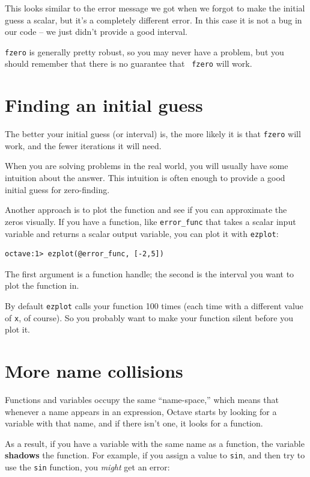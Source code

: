 \documentclass{book}
\begin{document}
This looks similar to the error message we got when we forgot to make the
initial guess a scalar, but it's a completely different error. In this case it
is not a bug in our code -- we just didn't provide a good interval.

{\tt fzero} is generally pretty robust, so you may never have a
problem, but you should remember that there is no guarantee that {\tt
fzero} will work.


\section{Finding an initial guess}

The better your initial guess (or interval) is, the more likely
it is that {\tt fzero} will work, and the fewer iterations it will
need.

When you are solving problems in the real world, you will usually
have some intuition about the answer. This intuition is often enough
to provide a good initial guess for zero-finding.

Another approach is to plot the function and see if you can
approximate the zeros visually. If you have a function, like
{\tt error\_func} that takes a scalar input variable and returns
a scalar output variable, you can plot it with {\tt ezplot}:

\begin{verbatim}
octave:1> ezplot(@error_func, [-2,5])
\end{verbatim}

The first argument is a function handle; the second is the 
interval you want to plot the function in.

By default {\tt ezplot} calls your function 100 times (each time
with a different value of {\tt x}, of course). So you probably want
to make your function silent before you plot it.

\section{More name collisions}

Functions and variables occupy the same ``name-space,'' which means
that whenever a name appears in an expression, Octave starts by looking
for a variable with that name, and if there isn't one, it looks for
a function.

As a result, if you have a variable with the same name as a function,
the variable {\bf shadows} the function. For example, if you assign
a value to {\tt sin}, and then try to use the {\tt sin} function, you
{\em might} get an error:
\end{document}

